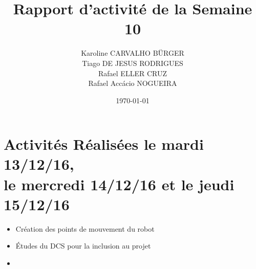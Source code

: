 \documentclass[11pt,a4paper,onecolumn]{articlewithlogo}
\title{Rapport d'activité de la Semaine 10}
\author{Karoline CARVALHO BÜRGER\\ Tiago DE JESUS RODRIGUES\\  Rafael ELLER CRUZ \\Rafael Accácio NOGUEIRA }
\date{\today}
\begin{document}
\maketitle
\section{Activités Réalisées le mardi 13/12/16, \\le mercredi 14/12/16 et le jeudi 15/12/16  }
\begin{itemize}
	\renewcommand\labelitemi{$\circ$}
	\item Création des points de mouvement du robot
	\item Études du DCS pour la inclusion au projet
	\item 
\end{itemize}


%
\end{document}
